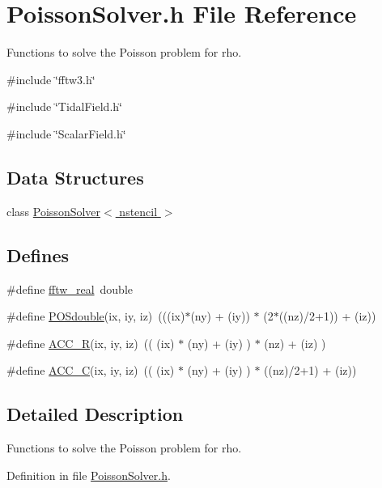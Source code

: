 \section{PoissonSolver.h File Reference}
\label{PoissonSolver_8h}


Functions to solve the Poisson problem for rho.  


{\ttfamily \#include \char`\"{}fftw3.h\char`\"{}}\par
{\ttfamily \#include \char`\"{}TidalField.h\char`\"{}}\par
{\ttfamily \#include \char`\"{}ScalarField.h\char`\"{}}\par
\subsection*{Data Structures}
\begin{DoxyCompactItemize}
\item 
class \hyperlink{classPoissonSolver}{PoissonSolver$<$ nstencil $>$}
\end{DoxyCompactItemize}
\subsection*{Defines}
\begin{DoxyCompactItemize}
\item 
\#define \hyperlink{PoissonSolver_8h_a5829f775aff7b5e2c04c4ec77020f4ac}{fftw\_\-real}~double
\item 
\#define \hyperlink{PoissonSolver_8h_a57c2f618d21bf58344c3d10ce4eb0425}{POSdouble}(ix, iy, iz)~(((ix)$\ast$(ny) + (iy)) $\ast$ (2$\ast$((nz)/2+1)) + (iz))
\item 
\#define \hyperlink{PoissonSolver_8h_a2893f2854bb6eb4f81510181ef7da98d}{ACC\_\-R}(ix, iy, iz)~(( (ix) $\ast$ (ny) + (iy) ) $\ast$ (nz) + (iz) )
\item 
\#define \hyperlink{PoissonSolver_8h_aa0ec3c1fa56accaf6945ccf59d19ec4a}{ACC\_\-C}(ix, iy, iz)~(( (ix) $\ast$ (ny) + (iy) ) $\ast$ ((nz)/2+1) + (iz))
\end{DoxyCompactItemize}


\subsection{Detailed Description}
Functions to solve the Poisson problem for rho. 

Definition in file \hyperlink{PoissonSolver_8h_source}{PoissonSolver.h}.



